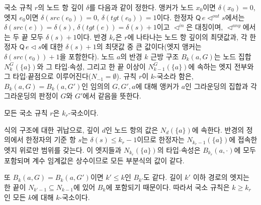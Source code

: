 \begin{jokdef}[깊이, 반경, 근방 구조]\label{def:radius}
국소 규칙 $r$의 노드 항 깊이 $\delta$를 다음과 같이 정한다. 앵커가 노드 $x_0$이면 $\delta(x_0) = 0$,
엣지 $e_0$이면 $\delta(\mathit{src}(e_0)) = 0$, $\delta(\mathit{tgt}(e_0)) = 1$이다. 한정자
$\mathsf{Q}\, e \lhd^{\mathit{out}} s$에서는 $\delta(\mathit{src}(e)) = \delta(s)$,
$\delta(\mathit{tgt}(e)) = \delta(s)+1$이고 $\lhd^{\mathit{in}}$은 대칭이며, $\lhd^{\mathit{any}}$에서는
두 끝 모두 $\delta(s)+1$이다. 반경 $k_r$은 $r$에 나타나는 노드 항 깊이의 최댓값과, 각 한정자
$\mathsf{Q}\, e \lhd s$에 대한 $\delta(s)+1$의 최댓값 중 큰 값이다(엣지 앵커는 $\delta(\mathit{src}(e_0))+1$을
포함한다). 노드 $a$의
반경 $k$ 근방 구조 $B_k(a,G)$는 노드 집합 $N_k^G(\{a\})$와 그 타입$\cdot$속성, 그리고 한 끝 이상이
$N_{k-1}^G(\{a\})$에 속하는 엣지 전부와 그 타입$\cdot$끝점으로 이루어진다($N_{-1} = \emptyset$).
규칙 $r$이 $k$-국소라 함은, $B_k(a,G) = B_k(a,G')$인 임의의 $G, G', a$에 대해 앵커가 $a$인 그라운딩의
집합과 각 그라운딩의 판정이 $G$와 $G'$에서 같음을 뜻한다.
\end{jokdef}

\begin{joklem}[가드 국소성]\label{lem:guard}
모든 국소 규칙 $r$은 $k_r$-국소이다.
\end{joklem}

\begin{jokproof}
식의 구조에 대한 귀납으로, 깊이 $d$인 노드 항의 값은 $N_d(\{a\})$에 속한다. 반경의 정의에서 한정자의
기준 항 $s$는 $\delta(s) \le k_r - 1$이므로 한정자는 $N_{k_r-1}(\{a\})$에 접속한 엣지 위로만 범위를 갖는다.
이 엣지들과 $N_{k_r}(\{a\})$의 타입$\cdot$속성은 $B_{k_r}(a,\cdot)$에 모두 포함되며 계수 임계값은 상수이므로
모든 부분식의 값이 같다.
\end{jokproof}

또 $B_k(a,G) = B_k(a,G')$이면 $k' \le k$인 $B_{k'}$도 같다. 길이 $k'$ 이하 경로의 엣지는 한 끝이
$N_{k'-1} \subseteq N_{k-1}$에 있어 $B_k$에 포함되기 때문이다. 따라서 국소 규칙은 $k \ge k_r$인 모든 $k$에
대해 $k$-국소이다.

